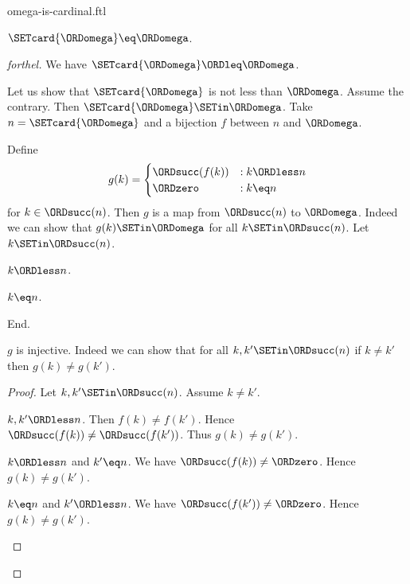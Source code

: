 \documentclass{stex}
\begin{document}
\begin{smodule}{omega-is-cardinal.ftl}

\begin{proposition}[forthel,id=SET_THEORY_07_4952029518626816]
  $\SETcard{\ORDomega} \eq \ORDomega$.
\end{proposition}
\begin{proof}[forthel]
  We have $\SETcard{\ORDomega} \ORDleq \ORDomega$.

  Let us show that $\SETcard{\ORDomega}$ is not less than $\ORDomega$.
    Assume the contrary.
    Then $\SETcard{\ORDomega} \SETin \ORDomega$.
    Take $n = \SETcard{\ORDomega}$ and a bijection $f$ between $n$ and $\ORDomega$.

    Define \[ g(k) =
      \begin{cases}
        \ORDsucc(f(k)) & : k \ORDless n
        \\
        \ORDzero           & : k \eq n
      \end{cases} \]
    for $k \in \ORDsucc(n)$.
    Then $g$ is a map from $\ORDsucc(n)$ to $\ORDomega$.
    Indeed we can show that $g(k) \SETin \ORDomega$ for all $k \SETin \ORDsucc(n)$.
      Let $k \SETin \ORDsucc(n)$.
      \begin{case}{$k \ORDless n$.} \end{case}
      \begin{case}{$k \eq n$.} \end{case}
    End.

    $g$ is injective.
    Indeed we can show that for all $k, k' \SETin \ORDsucc(n)$ if $k \neq k'$
    then $g(k) \neq g(k')$. 
    \begin{proof}
      Let $k, k' \SETin \ORDsucc(n)$.
      Assume $k \neq k'$.

      \begin{case}{$k, k' \ORDless n$.}
        Then $f(k) \neq f(k')$.
        Hence $\ORDsucc(f(k)) \neq \ORDsucc(f(k'))$.
        Thus $g(k) \neq g(k')$.
      \end{case}

      \begin{case}{$k \ORDless n$ and $k' \eq n$.}
        We have $\ORDsucc(f(k)) \neq \ORDzero$.
        Hence $g(k) \neq g(k')$.
      \end{case}

      \begin{case}{$k \eq n$ and $k' \ORDless n$.}
        We have $\ORDsucc(f(k')) \neq \ORDzero$.
        Hence $g(k) \neq g(k')$.
      \end{case}
    \end{proof}


\end{proof}
\end{smodule}
\end{document}
